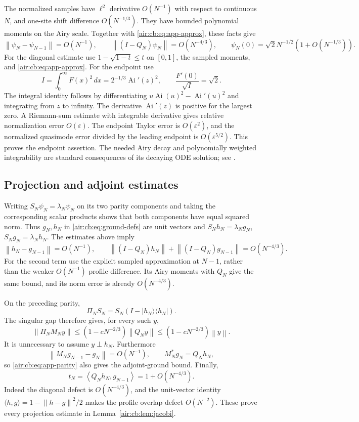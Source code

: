 \documentclass[11pt,letterpaper]{article}
\numberwithin{equation}{section}
\theoremstyle{remark}
\newcommand{\Ai}{\operatorname{Ai}}
\newcommand{\norm}[1]{\left\lVert#1\right\rVert}
\newcommand{\ip}[2]{\left\langle#1,#2\right\rangle}
\newcommand{\eps}{\varepsilon}
\begin{document}
The normalized samples have $\ell^2$ derivative $O(N^{-1})$ with respect
to continuous $N$, and one-site shift difference $O(N^{-1/3})$.
They have bounded polynomial moments on the Airy scale. Together with
\eqref{air:cb:eq:app-approx}, these facts give
\begin{equation}\label{air:cb:eq:app-consequences}
\norm{\psi_N-\psi_{N-1}}=O(N^{-1}),\qquad
\norm{(I-Q_N)\psi_N}=O(N^{-4/3}),\qquad
\psi_N(0)=\sqrt2 N^{-1/2}(1+O(N^{-1/3})).
\end{equation}
For the diagonal estimate use $1-\sqrt{1-t}\le t$ on $[0,1]$, the sampled
moments, and \eqref{air:cb:eq:app-approx}. For the endpoint use
\begin{equation}\label{air:cb:eq:airy-integral}
I=\int_0^\infty F(x)^2\,dx=2^{-1/3}\Ai'(z)^2,\qquad
\frac{F'(0)}{\sqrt I}=\sqrt2.
\end{equation}
The integral identity follows by differentiating
$u\Ai(u)^2-\Ai'(u)^2$ and integrating from $z$ to infinity.
The derivative $\Ai'(z)$ is positive for the largest zero. A Riemann-sum
estimate with integrable derivative gives relative normalization error
$O(\eps)$. The endpoint Taylor error is $O(\eps^2)$, and the normalized
quasimode error divided by the leading endpoint is $O(\eps^{5/2})$.
This proves the endpoint assertion. The needed Airy decay and polynomially
weighted integrability are standard consequences of its decaying ODE
solution; see \cite{dlmf}.

\subsection{Projection and adjoint estimates}
Writing $S_N\psi_N=\lambda_N\psi_N$ on its two parity components and taking
the corresponding scalar products shows that both components have equal
squared norm. Thus $g_N,h_N$ in \eqref{air:cb:eq:ground-defs} are unit vectors and
$S_Nh_N=\lambda_Ng_N$, $S_Ng_N=\lambda_Nh_N$. The estimates above imply
\begin{equation}\label{air:cb:eq:app-parity}
\norm{h_N-g_{N-1}}=O(N^{-1}),\qquad
\norm{(I-Q_N)h_N}+\norm{(I-Q_N)g_{N-1}}=O(N^{-4/3}).
\end{equation}
For the second term use the explicit sampled approximation at $N-1$,
rather than the weaker $O(N^{-1})$ profile difference. Its Airy moments
with $Q_N$ give the same bound, and its norm error is already
$O(N^{-4/3})$.

On the preceding parity,
\[
\Pi_NS_N=S_N(I-|h_N\rangle\langle h_N|).
\]
The singular gap therefore gives, for every such $y$,
\[
\norm{\Pi_NM_Ny}\le(1-cN^{-2/3})\norm{Q_Ny}
\le(1-cN^{-2/3})\norm y.
\]
It is unnecessary to assume $y\perp h_N$. Furthermore
\[
\norm{M_Ng_{N-1}-g_N}=O(N^{-1}),\qquad
M_N^*g_N=Q_Nh_N,
\]
so \eqref{air:cb:eq:app-parity} also gives the adjoint-ground bound.
Finally,
\[
t_N=\ip{Q_Nh_N}{g_{N-1}}=1+O(N^{-4/3}).
\]
Indeed the diagonal defect is $O(N^{-4/3})$, and the unit-vector identity
$\langle h,g\rangle=1-\norm{h-g}^2/2$ makes the profile overlap defect
$O(N^{-2})$. These prove every projection estimate in
Lemma~\ref{air:cb:lem:jacobi}.
\end{document}

